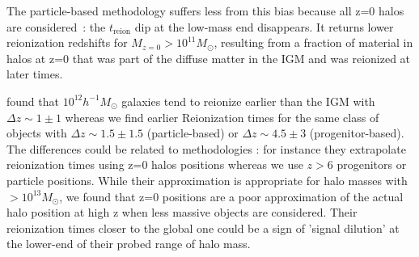 \documentclass[twocolumn]{aastex61}
\begin{document}
The particle-based methodology suffers less from this bias because all z=0 halos are considered~: the $t_\mathrm{reion}$ dip at the low-mass end disappears. It returns lower reionization redshifts for $M_{z=0}>10^{11} M_\odot$, resulting from  a fraction of material in halos at z=0 that was part of the diffuse matter in the IGM and was reionized at later times.

\citet{LI14} found  that $10^{12} h^{-1} M_\odot$ galaxies tend to reionize earlier than the IGM with $\Delta z\sim 1\pm1$ whereas we find earlier Reionization times for the same class of objects with $\Delta z\sim 1.5\pm 1.5$ (particle-based) or $\Delta z\sim 4.5\pm 3$ (progenitor-based). The differences could be related to methodologies : for instance they extrapolate reionization times using z=0 halos positions whereas we use $z>6$ progenitors or particle positions. While their approximation is appropriate for halo masses with $>10^{13} M_\odot$, we found that z=0 positions are a poor approximation of the actual halo position at high z when less massive objects are considered. Their reionization times closer to the global one could be a sign of 'signal dilution' at the lower-end of their probed range of halo mass. 
\end{document}
